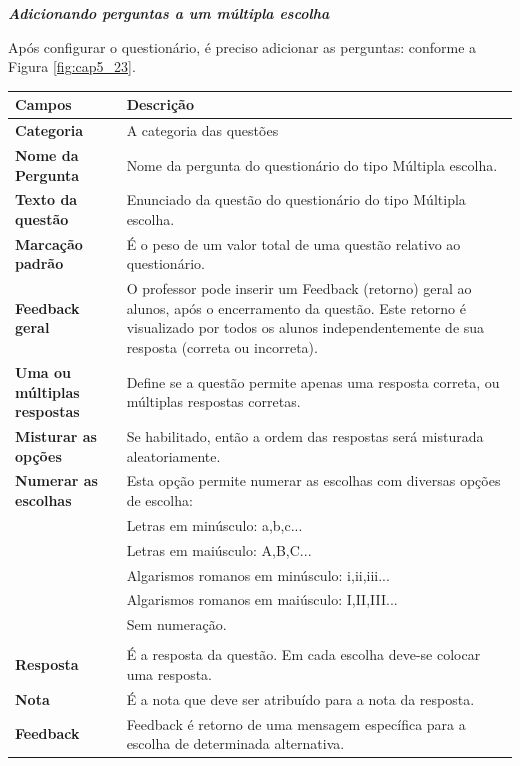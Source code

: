 \textit{\textbf{Adicionando perguntas a um múltipla escolha}}

Após configurar o questionário, é preciso adicionar as perguntas: conforme a Figura \ref{fig:cap5_23}.

\begin{longtable}{p{6cm}|p{9cm}}
     \hline
     \rowcolor[rgb]{0.8,0.8,0.8} \textbf{Campos} &  \textbf{Descrição}\\\hline
    \textbf{Categoria} & A categoria das questões \\\hline
    \textbf{Nome da Pergunta} & Nome da pergunta do questionário do tipo Múltipla escolha. \\\hline
    \textbf{Texto da questão} & Enunciado da questão do questionário do tipo Múltipla escolha.  \\\hline
    \textbf{Marcação padrão} &É o peso de um valor total de uma questão relativo ao questionário.  \\\hline
    \textbf{Feedback geral} & O professor  pode inserir um  Feedback (retorno)  geral  ao alunos,  após o encerramento da questão. Este retorno é visualizado por todos os alunos independentemente de sua resposta (correta ou incorreta).\\\hline
    \textbf{Uma ou múltiplas respostas} & Define se a questão permite apenas uma resposta correta, ou múltiplas respostas corretas.\\\hline
    \textbf{Misturar as opções} & Se habilitado, então a ordem das respostas será misturada aleatoriamente.\\\hline
    \textbf{Numerar as escolhas} & Esta opção permite numerar as escolhas com diversas opções de escolha:\\
&Letras em  minúsculo: a,b,c...\\
&Letras em maiúsculo: A,B,C...\\
&Algarismos romanos em minúsculo: i,ii,iii...\\
&Algarismos romanos em maiúsculo: I,II,III...\\
&Sem numeração.\\
  \\\hline
    \textbf{Resposta} &  É a resposta da questão. Em cada escolha deve-se colocar uma resposta.  \\\hline
    \textbf{Nota} &  É a nota que deve ser atribuído para a nota da resposta.\\\hline
    \textbf{Feedback} & Feedback é retorno de uma mensagem específica para a escolha de determinada alternativa.  \\\hline

\end{longtable}
